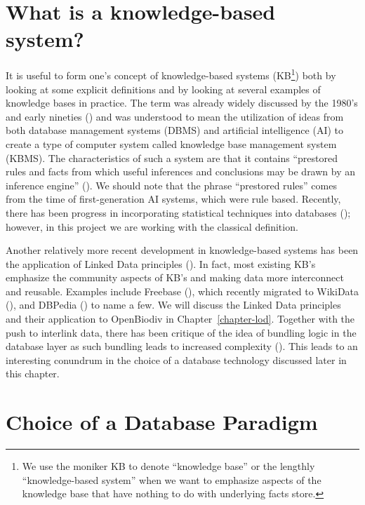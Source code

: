 \section{What is a knowledge-based system?}

It is useful to form one's concept of knowledge-based systems (KB\footnote{We use the moniker KB to denote ``knowledge base'' or the lengthly ``knowledge-based system'' when we want to emphasize aspects of the knowledge base that have nothing to do with underlying facts store.}) both by looking at some explicit definitions and by looking at several examples of knowledge bases in practice. The term was already widely discussed by the 1980's and early nineties (\cite{brodie_kbms_1989}) and was understood to mean the utilization of ideas from both database management systems (DBMS) and artificial intelligence (AI) to create a type of computer system called knowledge base management system (KBMS). The characteristics of such a system are that it contains ``prestored rules and facts from which useful inferences and conclusions may be drawn by an inference engine'' (\cite{harris_knowledge_1993}). We should note that the phrase ``prestored rules'' comes from the time of first-generation AI systems, which were rule based. Recently, there has been progress in incorporating statistical techniques into databases (\cite{mansinghka_bayesdb:_2015}); however, in this project we are working with the classical definition.

Another relatively more recent development in knowledge-based systems has been the application of Linked Data principles (\cite{heath_linked_2011}). In fact, most existing KB's emphasize the community aspects of KB's and making data more interconnect and reusable. Examples include Freebase (\cite{bollacker_freebase:_2008}), which recently migrated to WikiData (\cite{vrandecic_wikidata:_2014, pellissier_tanon_freebase_2016}), and DBPedia (\cite{hutchison_dbpedia:_2007}) to name a few. We will discuss the Linked Data principles and their application to OpenBiodiv in Chapter~\ref{chapter-lod}. Together with the push to interlink data, there has been critique of the idea of bundling logic in the database layer as such bundling leads to increased complexity (\cite{barrasa_rdf_2017}). This leads to an interesting conundrum in the choice of a database technology discussed later in this chapter.

\section{Choice of a Database Paradigm}

